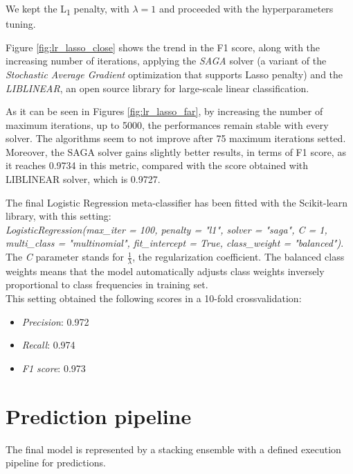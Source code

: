 We kept the L\textsubscript{1} penalty, with $ \lambda  = 1 $   and proceeded with the hyperparameters tuning.

Figure \ref{fig:lr_lasso_close} shows the trend in the F1 score, along with the increasing number of iterations, applying the \textit{SAGA}\cite{SAGA} solver (a variant of the \textit{Stochastic Average Gradient}\cite{SAG} optimization that supports Lasso penalty) and the \textit{LIBLINEAR}\cite{Liblinear}, an open source library for large-scale linear classification.

As it can be seen in Figures \ref{fig:lr_lasso_far}, by increasing the number of maximum iterations, up to 5000, the performances remain stable with every solver.
The algorithms seem to not improve after 75 maximum iterations setted.
Moreover, the SAGA solver gains slightly better results, in terms of F1 score, as it reaches 0.9734 in this metric, compared with the score obtained with LIBLINEAR solver, which is 0.9727.

The final Logistic Regression meta-classifier has been fitted with the Scikit-learn library, with this setting:\\
\textit{LogisticRegression(max\_iter = 100, penalty = "l1", solver = "saga", C = 1, multi\_class = "multinomial", fit\_intercept = True, class\_weight = "balanced")}.\\
The \textit{C} parameter stands for $ \frac{1}{\lambda} $, the regularization coefficient.
The balanced class weights means that the model automatically adjusts class weights inversely proportional to class frequencies in training set.\\
This setting obtained the following scores in a 10-fold crossvalidation:
\begin{itemize}
	\item[\PencilRight] \textit{Precision}: 0.972
	\item[\PencilRight] \textit{Recall}: 0.974
	\item[\PencilRight] \textit{F1 score}: 0.973
\end{itemize}
\section{Prediction pipeline}
The final model is represented by a stacking ensemble with a defined execution pipeline for predictions.


